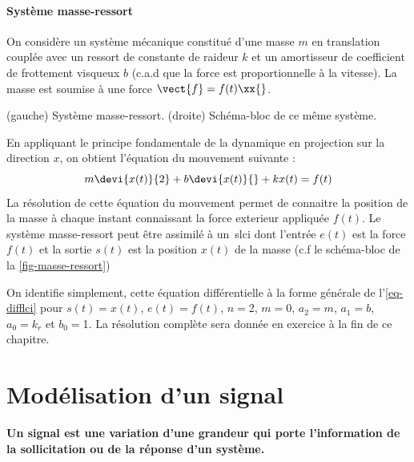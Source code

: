 \paragraph{Système masse-ressort\label{para-masse_ressort}}
On considère un système mécanique constitué d'une masse $m$ en translation 
couplée avec un ressort de constante
de raideur $k$ et un amortisseur de coefficient de frottement 
visqueux $b$ (c.a.d que la force est 
proportionnelle à la vitesse). 
La masse est soumise à une force $\vect{f}=f(t)\xx{}$.
\begin{marginfigure}[-8em]
    \centering
    
    \caption{(gauche) Système masse-ressort. (droite) Schéma-bloc de ce même 
    système.
    \label{fig-masse-ressort}}
\end{marginfigure}
En appliquant le principe fondamentale de la dynamique en projection 
sur la direction $x$, on obtient l'équation du mouvement suivante :
\[
m\devi{x(t)}{2}+b\devi{x(t)}{}+kx(t)=f(t)
\]
\newpage
\restoregeometry
\captionsetup{width=0.9\linewidth}
La résolution de cette équation du mouvement permet de connaitre la position 
de la masse à chaque instant connaissant la force exterieur 
appliquée $f(t)$. Le système masse-ressort peut être assimilé à un~\gls{slci} 
dont l'entrée $e(t)$ est la force $f(t)$ et la sortie $s(t)$ est la 
position $x(t)$ de la masse (c.f le schéma-bloc de la \cref{fig-masse-ressort})

On identifie simplement, cette équation différentielle à la forme générale 
de l'\cref{eq-difflci} pour $s(t)=x(t)$, $e(t)=f(t)$, 
$n=$2, $m=0$, $a_2=m$, $a_1=b$, $a_0=k_r$ et $b_0=$1.
La résolution complète sera donnée en exercice à la fin de ce chapitre.
\section{Modélisation d'un signal}
\textbf{Un signal est une variation d'une grandeur qui porte l'information 
de la sollicitation ou de la réponse d'un système.}


